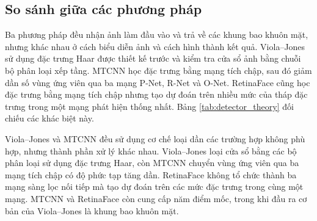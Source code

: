 \documentclass[../LuanVan.tex]{subfiles}
\begin{document}
\subsection{So sánh giữa các phương pháp}
\label{subsection:2.2.4}

Ba phương pháp đều nhận ảnh làm đầu vào và trả về các khung bao khuôn mặt, nhưng khác nhau ở cách biểu diễn ảnh và cách hình thành kết quả. Viola--Jones sử dụng đặc trưng Haar được thiết kế trước và kiểm tra cửa sổ ảnh bằng chuỗi bộ phân loại xếp tầng. MTCNN học đặc trưng bằng mạng tích chập, sau đó giảm dần số vùng ứng viên qua ba mạng P-Net, R-Net và O-Net. RetinaFace cũng học đặc trưng bằng mạng tích chập nhưng tạo dự đoán trên nhiều mức của tháp đặc trưng trong một mạng phát hiện thống nhất. Bảng \ref{tab:detector_theory} đối chiếu các khác biệt này.

\begin{table}[H]
    \centering
    \caption{So sánh giữa các phương pháp phát hiện khuôn mặt}
    \label{tab:detector_theory}
\end{table}

Viola--Jones và MTCNN đều sử dụng cơ chế loại dần các trường hợp không phù hợp, nhưng thành phần xử lý khác nhau. Viola--Jones loại cửa sổ bằng các bộ phân loại sử dụng đặc trưng Haar, còn MTCNN chuyển vùng ứng viên qua ba mạng tích chập có độ phức tạp tăng dần. RetinaFace không tổ chức thành ba mạng sàng lọc nối tiếp mà tạo dự đoán trên các mức đặc trưng trong cùng một mạng. MTCNN và RetinaFace còn cung cấp năm điểm mốc, trong khi đầu ra cơ bản của Viola--Jones là khung bao khuôn mặt.
\end{document}
